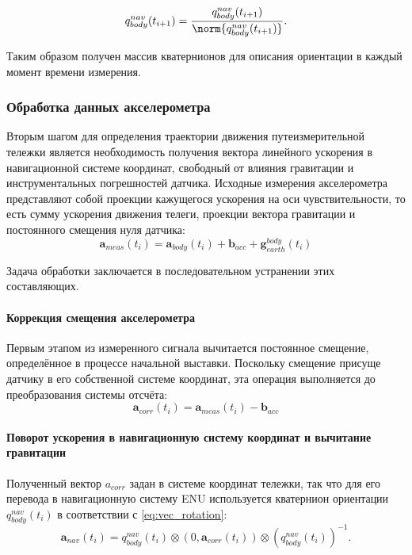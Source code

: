 \begin{equation*}
	q_{body}^{nav}(t_{i+1}) = \frac{q_{body}^{nav}(t_{i+1})}{\norm{q_{body}^{nav}(t_{i+1})}} \text{.}
\end{equation*}

Таким образом получен массив кватернионов для описания ориентации в каждый момент времени измерения.


\subsubsection{Обработка данных акселерометра}
Вторым шагом для определения траектории движения путеизмерительной тележки является необходимость получения вектора линейного ускорения в навигационной системе координат, свободный от влияния гравитации и инструментальных погрешностей датчика. Исходные измерения акселерометра представляют собой проекции кажущегося ускорения на оси чувствительности, то есть сумму ускорения движения телеги, проекции вектора гравитации и постоянного смещения нуля датчика:
\begin{equation}
	\bm{a}_{meas}(t_i) = \bm{a}_{body}(t_i) + \bm{b}_{acc} + \bm{g}_{earth}^{body}(t_i)
\end{equation}

Задача обработки заключается в последовательном устранении этих составляющих.

\paragraph{Коррекция смещения акселерометра}
Первым этапом из измеренного сигнала вычитается постоянное смещение, определённое в процессе начальной выставки. Поскольку смещение присуще датчику в его собственной системе координат, эта операция выполняется до преобразования системы отсчёта:
\begin{equation*}
	\bm{a}_{corr}(t_i) = \bm{a}_{meas}(t_i) - \bm{b}_{acc}
\end{equation*}

\paragraph{Поворот ускорения в навигационную систему координат и вычитание гравитации}
Полученный вектор $a_{corr}$ задан в системе координат тележки, так что для его перевода в навигационную систему ENU используется кватернион ориентации $q_{body}^{nav}(t_i)$ в соответствии с \eqref{eq:vec_rotation}:
\begin{equation*}
	\bm{a}_{nav}(t_i) = q_{body}^{nav}(t_i) \otimes (0, \bm{a}_{corr}(t_i)) \otimes (q_{body}^{nav}(t_i))^{-1} \text{.} 
\end{equation*}

